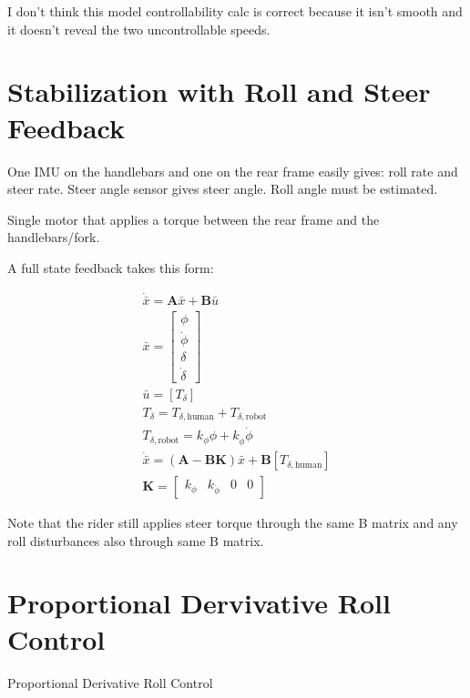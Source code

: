 \documentclass[12pt]{article}
\begin{document}
I don't think this model controllability calc is correct because it isn't
smooth and it doesn't reveal the two uncontrollable speeds.

\section{Stabilization with Roll and Steer Feedback}

One IMU on the handlebars and one on the rear frame easily gives: roll rate and
steer rate. Steer angle sensor gives steer angle. Roll angle must be estimated.

Single motor that applies a torque between the rear frame and the
handlebars/fork.

A full state feedback takes this form:

\begin{align}
  \dot{\bar{x}} = \mathbf{A} \bar{x} + \mathbf{B} \bar{u} \\
  \bar{x} = \begin{bmatrix} \phi \\ \dot{\phi} \\ \delta \\ \dot{\delta} \end{bmatrix} \\
  \bar{u} = \left[ T_\delta \right] \\
  T_\delta = T_{\delta,\textrm{human}} + T_{\delta,\textrm{robot}} \\
  T_{\delta,\textrm{robot}} = k_\phi \phi + k_{\dot{\phi}} \dot{\phi} \\
  \dot{\bar{x}} = \left( \mathbf{A} - \mathbf{B} \mathbf{K} \right) \bar{x} + \mathbf{B} \left[ T_{\delta,\textrm{human}} \right] \\
  \mathbf{K} = \begin{bmatrix} k_\phi & k_{\dot{\phi}} & 0 & 0 \end{bmatrix}
\end{align}

Note that the rider still applies steer torque through the same B matrix and
any roll disturbances also through same B matrix.

\section{Proportional Dervivative Roll Control}

Proportional Derivative Roll Control
\end{document}
